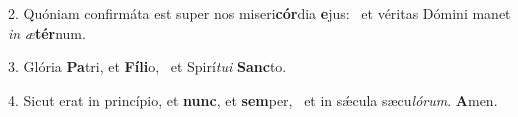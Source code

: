 2. Quóniam confirmáta est super nos miseri\textbf{cór}dia \textbf{e}jus: \ast\  et véritas Dómini manet \textit{in} \textit{æ}\textbf{tér}num.\

3. Glória \textbf{Pa}tri, et \textbf{Fí}\textbf{li}o, \ast\  et Spirí\textit{tu}\textit{i} \textbf{Sanc}to.\

4. Sicut erat in princípio, et \textbf{nunc}, et \textbf{sem}per, \ast\  et in sǽcula sæcu\textit{ló}\textit{rum}. \textbf{A}men.\

